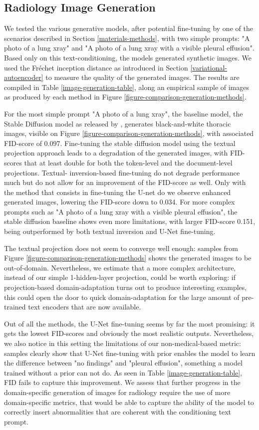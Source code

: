 \documentclass{article}
\begin{document}
\subsection{Radiology Image Generation}

We tested the various generative models, after potential fine-tuning by one of the scenarios described in Section \ref{materials-methods}, with two simple prompts: "A photo of a lung xray" and "A photo of a lung xray with a visible pleural effusion". Based only on this text-conditioning, the models generated synthetic images. We used the Fréchet inception distance as introduced in Section \ref{variational-autoencoder} to measure the quality of the generated images. The results are compiled in Table \ref{image-generation-table}, along an empirical sample of images as produced by each method in Figure \ref{figure-comparison-generation-methods}.

For the most simple prompt "A photo of a lung xray", the baseline model, the Stable Diffusion model as released by \cite{Rombach2022}, generates black-and-white thoracic images, visible on Figure \ref{figure-comparison-generation-methods}, with associated FID-score of 0.097. Fine-tuning the stable diffusion model using the textual projection approach leads to a degradation of the generated images, with FID-scores that at least double for both the token-level and the document-level projections. Textual- inversion-based fine-tuning do not degrade performance much but do not allow for an improvement of the FID-score as well. Only with the method that consists in fine-tuning the U-net do we observe enhanced generated images, lowering the FID-score down to 0.034. For more complex prompts such as "A photo of a lung xray with a visible pleural effusion", the stable diffusion baseline shows even more limitations, with larger FID-score 0.151, being outperformed by both textual inversion and U-Net fine-tuning.

The textual projection does not seem to converge well enough: samples from Figure \ref{figure-comparison-generation-methods} shows the generated images to be out-of-domain. Nevertheless, we estimate that a more complex architecture, instead of our simple 1-hidden-layer projection, could be worth exploring: if projection-based domain-adaptation turns out to produce interesting examples, this could open the door to quick domain-adaptation for the large amount of pre-trained text encoders that are now available.

Out of all the methods, the U-Net fine-tuning seems by far the most promising: it gets the lowest FID-scores and obviously the most realistic outputs. Nevertheless, we also notice in this setting the limitations of our non-medical-based metric: samples clearly show that U-Net fine-tuning with prior enables the model to learn the difference between "no findings" and "pleural effusion", something a model trained without a prior can not do. As seen in Table \ref{image-generation-table}, FID fails to capture this improvement. We assess that further progress in the domain-specific generation of images for radiology require the use of more domain-specific metrics, that would be able to capture the ability of the model to correctly insert abnormalities that are coherent with the conditioning text prompt.
\end{document}
